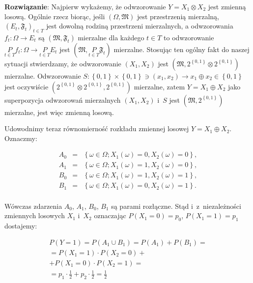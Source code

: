 \documentclass[a4paper,10pt, twocolumn]{article}
\begin{document}
\textbf{Rozwiązanie}: Najpierw wykażemy, że odwzorowanie $Y = X_{1} \otimes X_{2}$ jest zmienną losową. Ogólnie rzecz biorąc, jeśli $(\Omega, \mathfrak{M})$ jest przestrzenią mierzalną, $(E_{t}, \mathfrak{F}_{t})_{t \in T}$ jest dowolną rodziną przestrzeni mierzalnych, a odwzorowania $f_{t}: \Omega \rightarrow E_{t}$ są $(\mathfrak{M}, \mathfrak{F}_{t})$ mierzalne dla każdego $t \in T$ to odwzorowanie $\underset{t \in T}{P} f_{t}: \Omega \rightarrow \underset{t \in T}{P} E_{t}$ jest $(\mathfrak{M}, \underset{t \in T}{P} \mathfrak{F}_{t})$ mierzalne. Stosując ten ogólny fakt do naszej sytuacji stwierdzamy, że odwzorowanie $(X_{1}, X_{2})$ jest $(\mathfrak{M}, 2^{\left\{0,1\right\}} \otimes  2^{\left\{0,1\right\}})$ mierzalne. Odwzorowanie $S: \left\{0,1\right\} \times \left\{0,1\right\} \ni (x_{1}, x_{2}) \rightarrow x_{1} \oplus x_{2} \in \left\{0,1\right\}$ jest oczywiście $(2^{\left\{0,1\right\}} \otimes  2^{\left\{0,1\right\}},  2^{\left\{0,1\right\}})$ mierzalne, zatem $Y = X_{1} \oplus X_{2}$ jako superpozycja odwzorowań mierzalnych $(X_{1}, X_{2})$ i~$S$ jest $(\mathfrak{M},  2^{\left\{0,1\right\}})$ mierzalne, jest więc zmienną losową.

Udowodnimy teraz równomierność rozkładu zmiennej losowej $Y = X_{1} \oplus X_{2}$. Oznaczmy: 

\begin{equation*}
	\begin{array}{lcl} A_{0} & = & \left\{\omega \in \Omega; X_{1}(\omega) = 0, X_{2}(\omega) = 0 \right\}, \\ A_{1} & = & \left\{\omega \in \Omega; X_{1}(\omega) = 1, X_{2}(\omega) = 0 \right\}, \\ B_{0} & = & \left\{\omega \in \Omega; X_{1}(\omega) = 1, X_{2}(\omega) = 1 \right\}, \\ B_{1} & = & \left\{\omega \in \Omega; X_{1}(\omega) = 0, X_{2}(\omega) = 1 \right\}. \\\end{array}
\end{equation*}

\noindent Wówczas zdarzenia $A_{0}$, $A_{1}$, $B_{0}$, $B_{1}$ są parami rozłączne. Stąd i~z~niezależności zmiennych losowych $X_{1}$ i~$X_{2}$ oznaczając $P(X_{1} = 0) = p_{0}$, $P(X_{1} = 1) = p_{1}$ dostajemy:

\begin{equation*}
	\begin{array}{c} P(Y = 1) = P(A_{1} \cup B_{1}) = P(A_{1}) + P(B_{1}) = \\ = P(X_{1} = 1) \cdot P(X_{2} = 0) + \\ + P(X_{1} = 0) \cdot P(X_{2} = 1) = \\ = p_{1} \cdot \frac{1}{2} + p_{2} \cdot \frac{1}{2} = \frac{1}{2} \\ \end{array}
\end{equation*}
\end{document}

